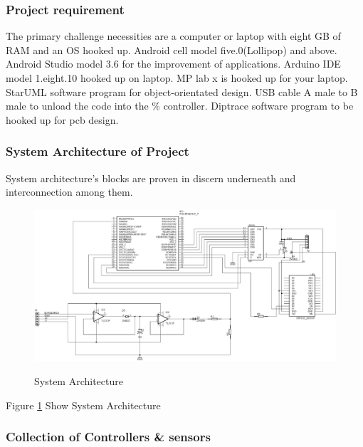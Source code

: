 \documentclass[12pt,a4paper]{article}
\begin{document}
\subsubsection{Project requirement}
\hspace{0.5cm}The primary challenge necessities are a computer or laptop with eight GB of RAM and an OS hooked up. Android cell model five.0(Lollipop) and above. Android Studio model 3.6 for the improvement of applications. Arduino IDE model 1.eight.10 hooked up on laptop. MP lab x is hooked up for your laptop. StarUML software program for object-orientated design. USB cable A male to B male to unload the code into the \% controller. Diptrace software program to be hooked up for pcb design.\\

\subsubsection{System Architecture of Project}
\hspace{0.5cm} System architecture’s blocks are proven in discern underneath and interconnection among them.\\

\begin{figure}[H]
	\centering
	\includegraphics[width=\linewidth]{flow_chart.jpeg}\\
	\caption{System Architecture}
	\label{fig:5.1.1}
\end{figure}
\begin{center}
Figure \ref{fig:5.1.1} Show System Architecture
\end{center}

\subsubsection{Collection of Controllers \& sensors}
\end{document}
